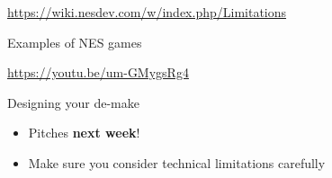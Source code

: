 \begin{frame}
	\begin{center}
		\url{https://wiki.nesdev.com/w/index.php/Limitations}
	\end{center}
\end{frame}

\begin{frame}{Examples of NES games}
	\begin{center}
		\url{https://youtu.be/um-GMygsRg4}
	\end{center}
\end{frame}

\begin{frame}{Designing your de-make}
	\begin{itemize}
		\pause\item Pitches \textbf{next week}!
		\pause\item Make sure you consider technical limitations carefully
	\end{itemize}
\end{frame}

